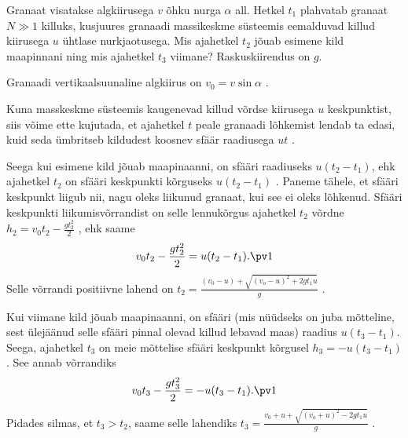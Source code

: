 \setAuthor{}

Granaat visatakse algkiirusega $v$ õhku nurga $\alpha$ all. Hetkel $t_1$ plahvatab granaat $N\gg1$ killuks, kusjuures granaadi massikeskme süsteemis eemalduvad killud kiirusega $u$ ühtlase nurkjaotusega. Mis ajahetkel $t_2$ jõuab esimene kild maapinnani ning mis ajahetkel $t_3$ viimane? Raskuskiirendus on $g$. 

\hint

\solu
Granaadi vertikaalsuunaline algkiirus on $v_0=v\sin\alpha$ .

Kuna masskeskme süsteemis kaugenevad killud võrdse kiirusega $u$ keskpunktist, siis võime ette kujutada, et ajahetkel $t$ peale granaadi lõhkemist lendab ta edasi, kuid seda ümbritseb kildudest koosnev sfäär raadiusega $ut$ .

Seega kui esimene kild jõuab maapinaanni, on sfääri raadiuseks $u(t_2-t_1)$, ehk ajahetkel $t_2$ on sfääri keskpunkti kõrguseks $u(t_2-t_1)$ . Paneme tähele, et sfääri keskpunkt liigub nii, nagu oleks liikunud granaat, kui see ei oleks lõhkenud. Sfääri keskpunkti liikumisvõrrandist on selle lennukõrgus ajahetkel $t_2$ võrdne $h_2=v_0t_2-\frac{gt_2^2}{2}$ , ehk saame
$$
v_0t_2-\frac{gt_2^2}{2}=u(t_2-t_1). \pv1
$$
Selle võrrandi positiivne lahend on $t_2=\frac{(v_0-u)+\sqrt{(v_o-u)^2+2gt_1u}}{g}$ .

Kui viimane kild jõuab maapinaanni, on sfääri (mis nüüdseks on juba mõtteline, sest ülejäänud selle sfääri pinnal olevad killud lebavad maas) raadius $u(t_3-t_1)$. Seega, ajahetkel $t_3$ on meie mõttelise sfääri keskpunkt kõrgusel $h_3=-u(t_3-t_1)$ . See annab võrrandiks
$$
v_0t_3-\frac{gt_3^2}{2}=-u(t_3-t_1). \pv1	
$$
Pidades silmas, et $t_3>t_2$, saame selle lahendiks $t_3=\frac{v_0+u+\sqrt{(v_o+u)^2-2gt_1u}}{g}$ .
\probend